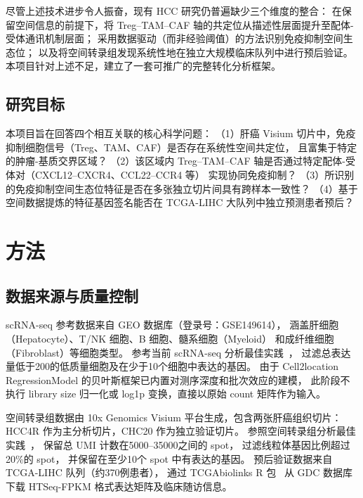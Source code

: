 \documentclass[12pt, a4paper]{ctexart}
\begin{document}
尽管上述技术进步令人振奋，现有 HCC 研究仍普遍缺少三个维度的整合：
在保留空间信息的前提下，将 Treg--TAM--CAF 轴的共定位从描述性层面提升至配体-受体通讯机制层面；
采用数据驱动（而非经验阈值）的方法识别免疫抑制空间生态位；
以及将空间转录组发现系统性地在独立大规模临床队列中进行预后验证。
本项目针对上述不足，建立了一套可推广的完整转化分析框架。

\subsection{研究目标}

本项目旨在回答四个相互关联的核心科学问题：
（1）肝癌 Visium 切片中，免疫抑制细胞信号（Treg、TAM、CAF）是否存在系统性空间共定位，
且富集于特定的肿瘤-基质交界区域？
（2）该区域内 Treg--TAM--CAF 轴是否通过特定配体-受体对（CXCL12--CXCR4、CCL22--CCR4 等）
实现协同免疫抑制？
（3）所识别的免疫抑制空间生态位特征是否在多张独立切片间具有跨样本一致性？
（4）基于空间数据提炼的特征基因签名能否在 TCGA-LIHC 大队列中独立预测患者预后？


\section{方法}

\subsection{数据来源与质量控制}

scRNA-seq 参考数据来自 GEO 数据库（登录号：GSE149614），
涵盖肝细胞（Hepatocyte）、T/NK 细胞、B 细胞、髓系细胞（Myeloid）
和成纤维细胞（Fibroblast）等细胞类型。
参考当前 scRNA-seq 分析最佳实践~\citep{luecken2019current}，
过滤总表达量低于200的低质量细胞及在少于10个细胞中表达的基因。
由于 Cell2location RegressionModel 的贝叶斯框架已内置对测序深度和批次效应的建模，
此阶段不执行 library size 归一化或 log1p 变换，直接以原始 count 矩阵作为输入。

空间转录组数据由 10x Genomics Visium 平台生成，包含两张肝癌组织切片：
HCC4R 作为主分析切片，CHC20 作为独立验证切片。
参照空间转录组分析最佳实践~\citep{williams2022introduction,palla2022squidpy}，
保留总 UMI 计数在5000--35000之间的 spot，
过滤线粒体基因比例超过20\%的 spot，
并保留在至少10个 spot 中有表达的基因。
预后验证数据来自 TCGA-LIHC 队列（约370例患者），
通过 TCGAbiolinks R 包~\citep{colaprico2016tcgabiolinks} 从 GDC 数据库下载 HTSeq-FPKM 格式表达矩阵及临床随访信息。
\end{document}

